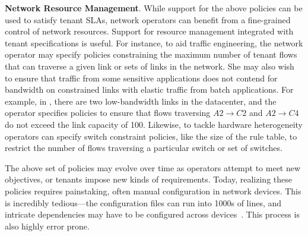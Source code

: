 \begin{compactitemize}
\item \textbf{Network Resource Management}. While support for the above
policies can be used to satisfy tenant SLAs, network operators can
benefit from a fine-grained control of network resources. Support for
resource management integrated with tenant specifications is useful.
For instance, to aid traffic engineering, the network
operator may specify policies constraining the maximum number of
tenant flows that can traverse a given link or sets of links in the
network. She may also wish to ensure that traffic from some sensitive
applications does not contend for bandwidth on constrained links with
elastic traffic from batch applications. For example, in ,
there are two low-bandwidth links in the datacenter, and the operator
specifies policies to ensure that flows traversing $A2 \rightarrow C2$ 
and $A2 \rightarrow C4$ do not exceed the link capacity of 100.
  Likewise, to tackle hardware heterogeneity operators can specify
  switch constraint policies, like the size of the rule table, to
  restrict the number of flows traversing a particular switch or set
  of switches.
\end{compactitemize}

The above set of policies may evolve over time as operators attempt to
meet new objectives, or tenants impose new kinds of
requirements. Today, realizing these policies requires painstaking,
often manual configuration in network devices. This is incredibly
tedious---the configuration files can run into 1000s of lines, and
intricate dependencies may have to be configured across
devices~\cite{benson:complexity:nsdi2009,mpa-imc15}. This process is also highly 
error prone.

